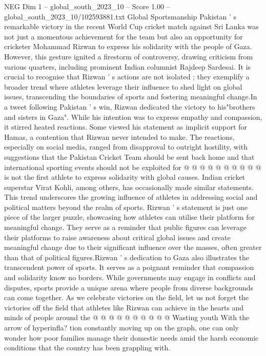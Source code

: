 \begin{textsample}{NEG Dim 1 – global\_south\_2023\_10 – Score 1.00 – global\_south\_2023\_10/102593881.txt}  \label{ex:f1_neg_263}
Global Sportsmanship Pakistan ' s remarkable victory in the recent World Cup cricket match against Sri Lanka was not just a momentous achievement for the team but also an opportunity for cricketer Mohammad Rizwan to express his solidarity with the people of Gaza.
However, this gesture ignited a firestorm of controversy, drawing criticism from various quarters, including prominent Indian columnist Rajdeep Sardesai.
It is crucial to recognise that Rizwan ' s actions are not isolated ; they exemplify a broader trend where athletes leverage their influence to shed light on global issues, transcending the boundaries of sports and fostering meaningful change.In a tweet following Pakistan ' s win, Rizwan dedicated the victory to his"brothers and sisters in Gaza".
While his intention was to express empathy and compassion, it stirred heated reactions.
Some viewed his statement as implicit support for Hamas, a contention that Rizwan never intended to make.
The reactions, especially on social media, ranged from disapproval to outright hostility, with suggestions that the Pakistan Cricket Team should be sent back home and that international sporting events should not be exploited for @ @ @ @ @ @ @ @ @ @ is not the first athlete to express solidarity with global causes.
Indian cricket superstar Virat Kohli, among others, has occasionally made similar statements.
This trend underscores the growing influence of athletes in addressing social and political matters beyond the realm of sports.
Rizwan ' s statement is just one piece of the larger puzzle, showcasing how athletes can utilise their platform for meaningful change.
They serve as a reminder that public figures can leverage their platforms to raise awareness about critical global issues and create meaningful change due to their significant influence over the masses, often greater than that of political figures.Rizwan ' s dedication to Gaza also illustrates the transcendent power of sports.
It serves as a poignant reminder that compassion and solidarity know no borders.
While governments may engage in conflicts and disputes, sports provide a unique arena where people from diverse backgrounds can come together.
As we celebrate victories on the field, let us not forget the victories off the field that athletes like Rizwan can achieve in the hearts and minds of people around the @ @ @ @ @ @ @ @ @ @ Wasting youth With the arrow of hyperinfla? tion constantly moving up on the graph, one can only wonder how poor families manage their domestic needs amid the harsh economic conditions that the country has been grappling with.

\end{textsample}
